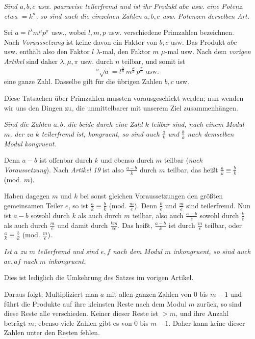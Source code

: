 
\emph{Sind $a, b, c$ usw. paarweise teilerfremd und ist ihr Produkt $abc$ usw. eine Potenz, etwa $=k^n$, so sind auch die einzelnen Zahlen $a, b, c$ usw. Potenzen derselben Art.}

Sei $a = l^\lambda m^\mu p^\pi$ usw., wobei $l, m, p$ usw. verschiedene Primzahlen bezeichnen. Nach \emph{Voraussetzung} ist keine davon ein Faktor von $b, c$ usw. Das Produkt $abc$ usw. enthält also den Faktor $l$ $\lambda$-mal, den Faktor $m$ $\mu$-mal usw. Nach dem \emph{vorigen Artikel} sind daher $\lambda, \mu, \pi$ usw. durch $n$ teilbar, und somit ist
\[
{}^{n}\!\surd a = l^{\frac{\lambda}{n}} \, m^{\frac{\mu}{n}} \, p^{\frac{\pi}{n}} \text{ usw.}
\]
eine ganze Zahl. Dasselbe gilt für die übrigen Zahlen $b, c$ usw.

Diese Tatsachen über Primzahlen mussten vorausgeschickt werden; nun wenden wir uns den Dingen zu, die unmittelbarer mit unserem Ziel zusammenhängen.


\emph{Sind die Zahlen $a, b$, die beide durch eine Zahl $k$ teilbar sind, nach einem Modul $m$, der zu $k$ teilerfremd ist, kongruent, so sind auch $\frac{a}{k}$ und $\frac{b}{k}$ nach demselben Modul kongruent.}

Denn $a-b$ ist offenbar durch $k$ und ebenso durch $m$ teilbar (\emph{nach Voraussetzung}). Nach \emph{Artikel 19} ist also $\frac{a-b}{k}$ durch $m$ teilbar, das heißt $\frac{a}{k} \equiv \frac{b}{k}$ (mod. $m$).

Haben dagegen $m$ und $k$ bei sonst gleichen Voraussetzungen den größten gemeinsamen Teiler $e$, so ist $\frac{a}{k} \equiv \frac{b}{k}$ (mod. $\frac{m}{e}$). Denn $\frac{k}{e}$ und $\frac{m}{e}$ sind teilerfremd. Nun ist $a-b$ sowohl durch $k$ als auch durch $m$ teilbar, also auch $\frac{a-b}{e}$ sowohl durch $\frac{k}{e}$ als auch durch $\frac{m}{e}$ und damit durch $\frac{km}{ee}$. Das heißt, $\frac{a-b}{k}$ ist durch $\frac{m}{e}$ teilbar, oder $\frac{a}{k} \equiv \frac{b}{k}$ (mod. $\frac{m}{e}$).


\emph{Ist $a$ zu $m$ teilerfremd und sind $e, f$ nach dem Modul $m$ inkongruent, so sind auch $ae, af$ nach $m$ inkongruent.}

Dies ist lediglich die Umkehrung des Satzes im vorigen Artikel.

Daraus folgt: Multipliziert man $a$ mit allen ganzen Zahlen von $0$ bis $m-1$ und führt die Produkte auf ihre kleinsten Reste nach dem Modul $m$ zurück, so sind diese Reste alle verschieden. Keiner dieser Reste ist $> m$, und ihre Anzahl beträgt $m$; ebenso viele Zahlen gibt es von $0$ bis $m-1$. Daher kann keine dieser Zahlen unter den Resten fehlen.

